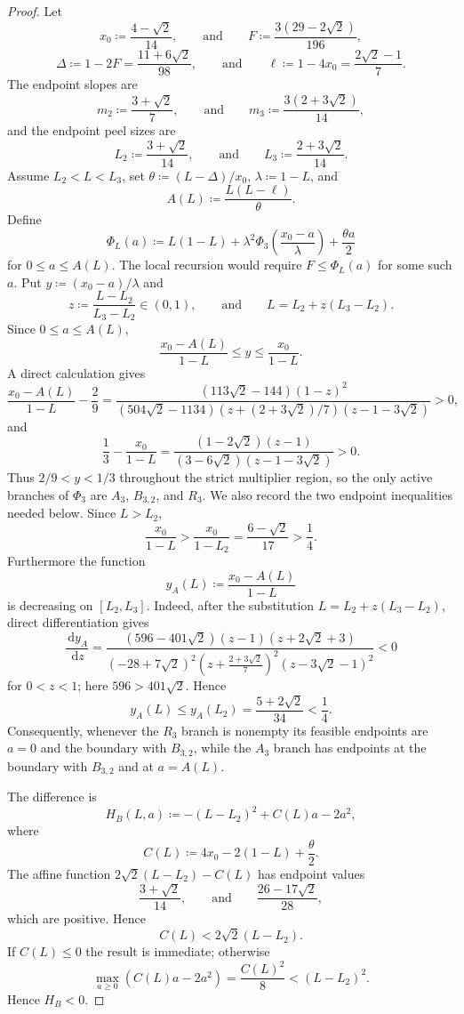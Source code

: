 \documentclass[10pt]{article}
\numberwithin{equation}{section}
\newcommand{\dd}{\,\mathrm d}
\begin{document}
\begin{proof}
Let
\[
 x_0\coloneqq\frac{4-\sqrt2}{14},
 \qquad\text{and}\qquad
 F\coloneqq\frac{3(29-2\sqrt2)}{196},
\]
\[
 \Delta\coloneqq1-2F=\frac{11+6\sqrt2}{98},
 \qquad\text{and}\qquad
 \ell\coloneqq1-4x_0=\frac{2\sqrt2-1}{7}.
\]
The endpoint slopes are
\[
 m_2\coloneqq\frac{3+\sqrt2}{7},
 \qquad\text{and}\qquad
 m_3\coloneqq\frac{3(2+3\sqrt2)}{14},
\]
and the endpoint peel sizes are
\[
 L_2\coloneqq\frac{3+\sqrt2}{14},
 \qquad\text{and}\qquad
 L_3\coloneqq\frac{2+3\sqrt2}{14}.
\]
Assume $L_2<L<L_3$, set $\theta\coloneqq(L-\Delta)/x_0$, $\lambda\coloneqq1-L$, and
\[
 A(L)\coloneqq\frac{L(L-\ell)}{\theta}.
\]
Define
\[
 \Phi_L(a)\coloneqq
 L(1-L)+\lambda^2\Phi_3\left(\frac{x_0-a}{\lambda}\right)+\frac{\theta a}{2}
\]
for $0\le a\le A(L)$.  The local recursion would require $F\le\Phi_L(a)$ for some such $a$.  Put $y\coloneqq(x_0-a)/\lambda$ and
\[
 z\coloneqq\frac{L-L_2}{L_3-L_2}\in(0,1),
 \qquad\text{and}\qquad
 L=L_2+z(L_3-L_2).
\]
Since $0\le a\le A(L)$,
\[
 \frac{x_0-A(L)}{1-L}\le y\le\frac{x_0}{1-L}.
\]
A direct calculation gives
\[
 \frac{x_0-A(L)}{1-L}-\frac29
 =\frac{(113\sqrt2-144)(1-z)^2}
 {(504\sqrt2-1134)
  (z+(2+3\sqrt2)/7)(z-1-3\sqrt2)}>0,
\]
and
\[
 \frac13-\frac{x_0}{1-L}
 =\frac{(1-2\sqrt2)(z-1)}
 {(3-6\sqrt2)(z-1-3\sqrt2)}>0.
\]
Thus $2/9<y<1/3$ throughout the strict multiplier region, so the only active branches of $\Phi_3$ are $A_3$, $B_{3,2}$, and $R_3$.  We also record the two endpoint inequalities needed below.  Since $L>L_2$,
\[
 \frac{x_0}{1-L}
 >\frac{x_0}{1-L_2}
 =\frac{6-\sqrt2}{17}>\frac14.
\]
Furthermore the function
\[
 y_A(L)\coloneqq\frac{x_0-A(L)}{1-L}
\]
is decreasing on $[L_2,L_3]$.  Indeed, after the substitution $L=L_2+z(L_3-L_2)$, direct differentiation gives
\[
 \frac{\dd y_A}{\dd z}
 =\frac{(596-401\sqrt2)(z-1)(z+2\sqrt2+3)}
 {(-28+7\sqrt2)^2
  \left(z+\frac{2+3\sqrt2}{7}\right)^2
  (z-3\sqrt2-1)^2}<0
\]
for $0<z<1$; here $596>401\sqrt2$.  Hence
\[
 y_A(L)\le y_A(L_2)
 =\frac{5+2\sqrt2}{34}<\frac14.
\]
Consequently, whenever the $R_3$ branch is nonempty its feasible endpoints are $a=0$ and the boundary with $B_{3,2}$, while the $A_3$ branch has endpoints at the boundary with $B_{3,2}$ and at $a=A(L)$.

The difference is
\[
 H_B(L,a)\coloneqq-(L-L_2)^2+C(L)a-2a^2,
\]
where
\[
 C(L)\coloneqq4x_0-2(1-L)+\frac\theta2.
\]
The affine function $2\sqrt2(L-L_2)-C(L)$ has endpoint values
\[
 \frac{3+\sqrt2}{14},
 \qquad\text{and}\qquad
 \frac{26-17\sqrt2}{28},
\]
which are positive.  Hence
\[
 C(L)<2\sqrt2(L-L_2).
\]
If $C(L)\le0$ the result is immediate; otherwise
\[
 \max_{a\ge0}(C(L)a-2a^2)=\frac{C(L)^2}{8}<(L-L_2)^2.
\]
Hence $H_B<0$.


\end{proof}
\end{document}
